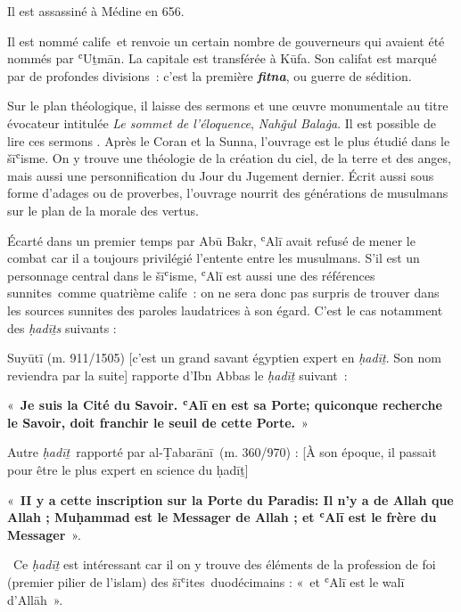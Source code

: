 {Il est assassiné à Médine en 656.


Il est nommé calife~et renvoie un certain nombre de gouverneurs qui
avaient été nommés par ʿUṯmān. La capitale est transférée à Kūfa. Son
califat est marqué par de profondes divisions~: c'est la première
\emph{\textbf{fitna}}, ou guerre de sédition.

Sur le plan théologique, il laisse des sermons et une œuvre monumentale
au titre évocateur intitulée \emph{Le sommet de l'éloquence},
\emph{Nahǧul Balaġa}. Il est possible de lire ces sermons
. Après le Coran et la Sunna, l'ouvrage est le plus étudié dans
le šīʿisme. On y trouve une théologie de la création du ciel, de la
terre et des anges, mais aussi une personnification du Jour du Jugement
dernier. Écrit aussi sous forme d'adages ou de proverbes, l'ouvrage
nourrit des générations de musulmans sur le plan de la morale des
vertus.

Écarté dans un premier temps par Abū Bakr, ʿAlī avait refusé de mener le
combat car il a toujours privilégié l'entente entre les musulmans. S'il
est un personnage central dans le šīʿisme, ʿAlī est aussi une des
références sunnites~comme quatrième calife~: on ne sera donc pas surpris
de trouver dans les sources sunnites des paroles laudatrices à son
égard. C'est le cas notamment des \emph{ḥadīṯs} suivants :

Suyūtī (m. 911/1505) {[}c'est un grand savant égyptien expert en
\emph{ḥadīṯ}. Son nom reviendra par la suite{]} rapporte d'Ibn Abbas le
\emph{ḥadīṯ} suivant~:

«~\textbf{Je suis la Cité du Savoir. ʿAlī en est sa Porte; quiconque
recherche le Savoir, doit franchir le seuil de cette Porte.}~»

Autre \emph{ḥadīṯ}~rapporté par al-Ṭabarānī~(m. 360/970) : {[}À son
époque, il passait pour être le plus expert en science du ḥadīṯ{]}

«~\textbf{II y a cette inscription sur la Porte du Paradis: Il n'y a de
Allah que Allah ; Muḥammad est le Messager de Allah ; et ʿAlī est le
frère du Messager}~».~

~Ce \emph{ḥadīṯ} est intéressant car il on y trouve des éléments de la
profession de foi (premier pilier de l'islam) des šīʿites~duodécimains :
«~et ʿAlī est le walī d'Allāh~».

}
